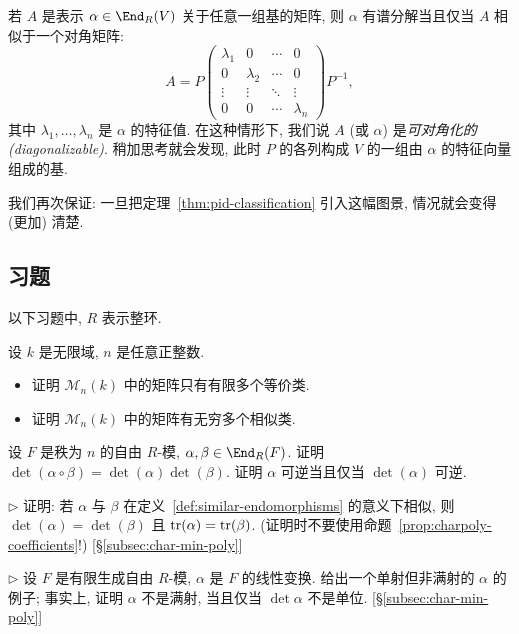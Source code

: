 若 $A$ 是表示 $\alpha\in\End_R(V)$ 关于任意一组基的矩阵, 则 $\alpha$ 有谱分解当且仅当 $A$ 相似于一个对角矩阵:
\[
A=P\begin{pmatrix}\lambda_1&0&\cdots&0\\0&\lambda_2&\cdots&0\\\vdots&\vdots&\ddots&\vdots\\0&0&\cdots&\lambda_n\end{pmatrix}P^{-1},
\]
其中 $\lambda_1,\ldots,\lambda_n$ 是 $\alpha$ 的特征值. 在这种情形下, 我们说 $A$ (或 $\alpha$) 是\emph{可对角化的 (diagonalizable)}. 稍加思考就会发现, 此时 $P$ 的各列构成 $V$ 的一组由 $\alpha$ 的特征向量组成的基.

我们再次保证: 一旦把定理~\ref{thm:pid-classification} 引入这幅图景, 情况就会变得 (更加) 清楚.

\subsection*{习题}
{}

以下习题中, $R$ 表示整环.

\begin{prob}\label{ex:similarity-classes-infinite}
设 $k$ 是无限域, $n$ 是任意正整数.
\begin{itemize}
	\item 证明 $\mathcal{M}_n(k)$ 中的矩阵只有有限多个等价类.
	\item 证明 $\mathcal{M}_n(k)$ 中的矩阵有无穷多个相似类.
\end{itemize}
\end{prob}

\begin{prob}\label{ex:det-multiplicative}
设 $F$ 是秩为 $n$ 的自由 $R$-模, $\alpha,\beta\in\End_R(F)$. 证明 $\det(\alpha\circ\beta)=\det(\alpha)\det(\beta)$. 证明 $\alpha$ 可逆当且仅当 $\det(\alpha)$ 可逆.
\end{prob}

\begin{prob}\label{ex:similar-same-det-trace}
$\triangleright$ 证明: 若 $\alpha$ 与 $\beta$ 在定义~\ref{def:similar-endomorphisms} 的意义下相似, 则 $\det(\alpha)=\det(\beta)$ 且 $\operatorname{tr}(\alpha)=\operatorname{tr}(\beta)$. (证明时不要使用命题~\ref{prop:charpoly-coefficients}!) [§\ref{subsec:char-min-poly}]
\end{prob}

\begin{prob}\label{ex:injective-not-surjective}
$\triangleright$ 设 $F$ 是有限生成自由 $R$-模, $\alpha$ 是 $F$ 的线性变换. 给出一个单射但非满射的 $\alpha$ 的例子; 事实上, 证明 $\alpha$ 不是满射, 当且仅当 $\det\alpha$ 不是单位. [§\ref{subsec:char-min-poly}]
\end{prob}

